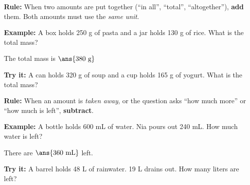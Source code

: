\documentclass[12pt]{article}
\begin{document}


\begin{formulabox}
\textbf{Rule:} When two amounts are put together (``in all'', ``total'',
``altogether''), \textbf{add} them. Both amounts must use the \emph{same unit}.
\end{formulabox}

\begin{examplebox}
\textbf{Example:} A box holds 250 g of pasta and a jar holds 130 g of rice.
What is the total mass?

The total mass is $\ans{380\ \text{g}}$
\end{examplebox}

\begin{tryitbox}
\textbf{Try it:} A can holds 320 g of soup and a cup holds 165 g of yogurt.
What is the total mass?\\[2pt]
\end{tryitbox}


\begin{formulabox}
\textbf{Rule:} When an amount is \emph{taken away}, or the question asks
``how much more'' or ``how much is left'', \textbf{subtract}.
\end{formulabox}

\begin{examplebox}
\textbf{Example:} A bottle holds 600 mL of water. Nia pours out 240 mL.
How much water is left?

There are $\ans{360\ \text{mL}}$ left.
\end{examplebox}

\begin{tryitbox}
\textbf{Try it:} A barrel holds 48 L of rainwater. 19 L drains out. How many
liters are left?\\[2pt]
\end{tryitbox}
\end{document}
